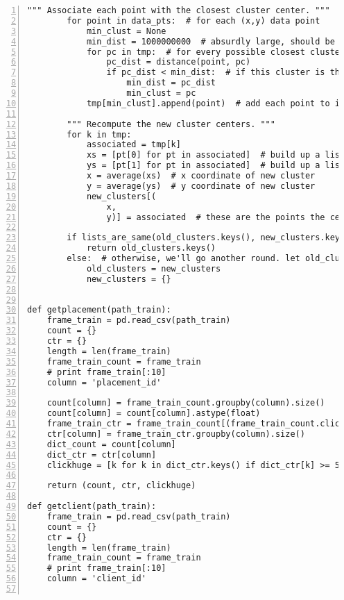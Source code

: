 \begin{lstlisting}[numbers=left, breaklines=true]
        """ Associate each point with the closest cluster center. """
        for point in data_pts:  # for each (x,y) data point
            min_clust = None
            min_dist = 1000000000  # absurdly large, should be larger than the maximum distance for most data sets
            for pc in tmp:  # for every possible closest cluster
                pc_dist = distance(point, pc)
                if pc_dist < min_dist:  # if this cluster is the closest, have it be the closest (duh)
                    min_dist = pc_dist
                    min_clust = pc
            tmp[min_clust].append(point)  # add each point to its closest cluster's list of associated points

        """ Recompute the new cluster centers. """
        for k in tmp:
            associated = tmp[k]
            xs = [pt[0] for pt in associated]  # build up a list of x's
            ys = [pt[1] for pt in associated]  # build up a list of y's
            x = average(xs)  # x coordinate of new cluster
            y = average(ys)  # y coordinate of new cluster
            new_clusters[(
                x,
                y)] = associated  # these are the points the center was built off of, they're *probably* still associated

        if lists_are_same(old_clusters.keys(), new_clusters.keys()):  # if we've reached equilibrium, return the points
            return old_clusters.keys()
        else:  # otherwise, we'll go another round. let old_clusters = new_clusters, and clear new_clusters.
            old_clusters = new_clusters
            new_clusters = {}


def getplacement(path_train):
    frame_train = pd.read_csv(path_train)
    count = {}
    ctr = {}
    length = len(frame_train)
    frame_train_count = frame_train
    # print frame_train[:10]
    column = 'placement_id'

    count[column] = frame_train_count.groupby(column).size()
    count[column] = count[column].astype(float)
    frame_train_ctr = frame_train_count[(frame_train_count.click_count == 1)]
    ctr[column] = frame_train_ctr.groupby(column).size()
    dict_count = count[column]
    dict_ctr = ctr[column]
    clickhuge = [k for k in dict_ctr.keys() if dict_ctr[k] >= 500 and dict_count[k] >= 30000]

    return (count, ctr, clickhuge)

def getclient(path_train):
    frame_train = pd.read_csv(path_train)
    count = {}
    ctr = {}
    length = len(frame_train)
    frame_train_count = frame_train
    # print frame_train[:10]
    column = 'client_id'


\end{lstlisting}
